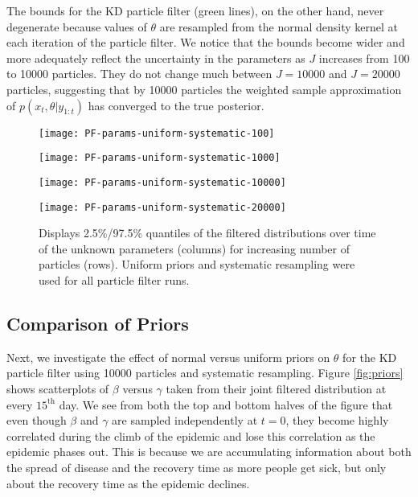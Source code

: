 \documentclass{elsarticle}
\begin{document}
The bounds for the KD particle filter (green lines), on the other hand, never degenerate because values of $\theta$ are resampled from the normal density kernel at each iteration of the particle filter.  We notice that the bounds become wider and more adequately reflect the uncertainty in the parameters as $J$ increases from 100 to 10000 particles.  They do not change much between $J = 10000$ and $J = 20000$ particles, suggesting that by 10000 particles the weighted sample approximation of $p(x_t,\theta|y_{1:t})$ has converged to the true posterior.

\begin{figure}[ht]
\centering
\begin{minipage}{1.0\linewidth}
\texttt{[image: PF-params-uniform-systematic-100]}
\end{minipage}
\begin{minipage}{1.0\linewidth}
\texttt{[image: PF-params-uniform-systematic-1000]}
\end{minipage}
\begin{minipage}{1.0\linewidth}
\texttt{[image: PF-params-uniform-systematic-10000]}
\end{minipage}
\begin{minipage}{1.0\linewidth}
\texttt{[image: PF-params-uniform-systematic-20000]}
\end{minipage}
\caption{Displays 2.5\%/97.5\% quantiles of the filtered distributions over time of the unknown parameters (columns) for increasing number of particles (rows).  Uniform priors and systematic resampling were used for all particle filter runs.} \label{fig:unisys}
\end{figure}

\subsection{Comparison of Priors}

Next, we investigate the effect of normal versus uniform priors on $\theta$ for the KD particle filter using 10000 particles and systematic resampling.  Figure \ref{fig:priors} shows scatterplots of $\beta$ versus $\gamma$ taken from their joint filtered distribution at every $15^{\mbox{th}}$ day.  We see from both the top and bottom halves of the figure that even though $\beta$ and $\gamma$ are sampled independently at $t = 0$, they become highly correlated during the climb of the epidemic and lose this correlation as the epidemic phases out.  This is because we are accumulating information about both the spread of disease and the recovery time as more people get sick, but only about the recovery time as the epidemic declines.
\end{document}
